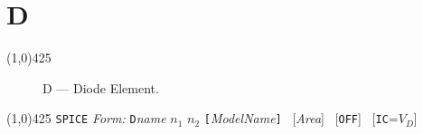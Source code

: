 
\oddsidemargin 10mm \topmargin 0.0in \textwidth 5.5in \textheight
7.375in \evensidemargin 1.0in \headheight 0.18in \footskip 0.16in
%
\section[D \- Diode]{ \hspace{120mm}\huge\textbf{D}}
\linethickness{1mm}
\line(1,0){425}
\normalsize
\begin{figure}[h]
\centerline{\epsfxsize=1in} \caption{D ---
Diode Element.}
\end{figure}
\newline
\linethickness{0.5mm} \line(1,0){425}
\newline
\texttt{SPICE} \textit{Form:}
\newline
\texttt{D}\textit{name} $n_1$ $n_2$
\texttt{[}\textit{ModelName}\texttt{]} \ [\textit{Area}] \
[\texttt{OFF}] \ [\texttt{IC}=$V_D$]
\newline
\newline
